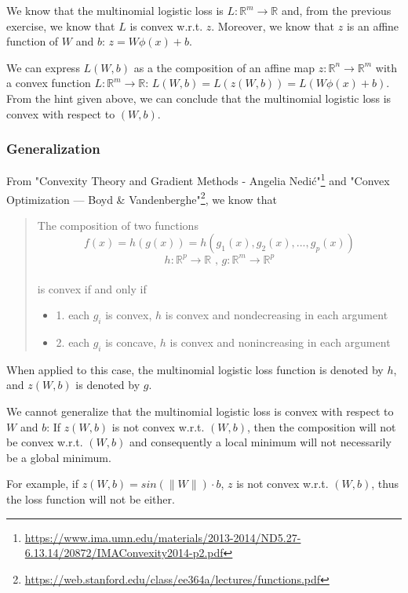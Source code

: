 \documentclass[10pt]{article}
\begin{document}
We know that the multinomial logistic loss is $L : \mathbb{R}^{m} \rightarrow \mathbb{R}$ and, from the previous exercise, we know that $L$ is convex w.r.t. $z$. Moreover, we know that $z$ is an affine function of $W$ and $b$: $z = W\phi(x) + b$.

We can express $L(W, b)$ as a the composition of an affine map $z : \mathbb{R}^{n} \rightarrow \mathbb{R}^{m}$ with a convex function $L : \mathbb{R}^{m} \rightarrow \mathbb{R}$: $L(W, b) = L(z(W, b)) = L(W\phi(x) + b)$.
From the hint given above, we can conclude that the multinomial logistic loss is convex with respect to $(W, b)$.

\subsubsection{Generalization}

From "Convexity Theory and Gradient Methods - Angelia Nedić"\footnote{\url{https://www.ima.umn.edu/materials/2013-2014/ND5.27-6.13.14/20872/IMAConvexity2014-p2.pdf}} and "Convex Optimization — Boyd \& Vandenberghe"\footnote{\url{https://web.stanford.edu/class/ee364a/lectures/functions.pdf}}, we know that

\begin{quote}
    The composition of two functions
    $$f(x) = h(g(x)) = h(g_{1}(x), g_{2}(x), ... , g_{p}(x))$$ $$h: \mathbb{R}^{p} \rightarrow \mathbb{R} \mbox{ , } g: \mathbb{R}^{m} \rightarrow \mathbb{R}^{p}$$\\ is convex if and only if
    \begin{itemize}
        \item 1. each $g_i$ is convex, $h$ is convex and nondecreasing in each argument
        \item 2. each $g_i$ is concave, $h$ is convex and nonincreasing in each argument
    \end{itemize}
\end{quote}

When applied to this case, the multinomial logistic loss function is denoted by $h$, and $z(W, b)$ is denoted by $g$.

We cannot generalize that the multinomial logistic loss is convex with respect to $W$ and $b$: If $z(W, b)$ is not convex w.r.t. $(W, b)$, then the composition will not be convex w.r.t. $(W, b)$ and consequently a local minimum will not necessarily be a global minimum.

For example, if $z(W, b) = sin(\lVert W \rVert) \cdot b$, $z$ is not convex w.r.t. $(W, b)$, thus the loss function will not be either.
\end{document}
